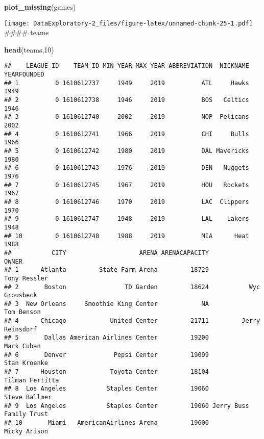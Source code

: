 \documentclass[
]{article}
\newenvironment{Shaded}{\begin{snugshade}}{\end{snugshade}}
\newcommand{\DecValTok}[1]{\textcolor[rgb]{0.00,0.00,0.81}{#1}}
\newcommand{\KeywordTok}[1]{\textcolor[rgb]{0.13,0.29,0.53}{\textbf{#1}}}
\newcommand{\NormalTok}[1]{#1}
\begin{document}
\begin{Shaded}
\begin{Highlighting}[]
\KeywordTok{plot\_missing}\NormalTok{(games)}
\end{Highlighting}
\end{Shaded}

\texttt{[image: DataExploratory-2\_files/figure-latex/unnamed-chunk-25-1.pdf]}
\#\#\#\# teams

\begin{Shaded}
\begin{Highlighting}[]
\KeywordTok{head}\NormalTok{(teams,}\DecValTok{10}\NormalTok{)}
\end{Highlighting}
\end{Shaded}

\begin{verbatim}
##    LEAGUE_ID    TEAM_ID MIN_YEAR MAX_YEAR ABBREVIATION  NICKNAME YEARFOUNDED
## 1          0 1610612737     1949     2019          ATL     Hawks        1949
## 2          0 1610612738     1946     2019          BOS   Celtics        1946
## 3          0 1610612740     2002     2019          NOP  Pelicans        2002
## 4          0 1610612741     1966     2019          CHI     Bulls        1966
## 5          0 1610612742     1980     2019          DAL Mavericks        1980
## 6          0 1610612743     1976     2019          DEN   Nuggets        1976
## 7          0 1610612745     1967     2019          HOU   Rockets        1967
## 8          0 1610612746     1970     2019          LAC  Clippers        1970
## 9          0 1610612747     1948     2019          LAL    Lakers        1948
## 10         0 1610612748     1988     2019          MIA      Heat        1988
##           CITY                    ARENA ARENACAPACITY                   OWNER
## 1      Atlanta         State Farm Arena         18729            Tony Ressler
## 2       Boston                TD Garden         18624           Wyc Grousbeck
## 3  New Orleans     Smoothie King Center            NA              Tom Benson
## 4      Chicago            United Center         21711         Jerry Reinsdorf
## 5       Dallas American Airlines Center         19200              Mark Cuban
## 6       Denver             Pepsi Center         19099            Stan Kroenke
## 7      Houston            Toyota Center         18104         Tilman Fertitta
## 8  Los Angeles           Staples Center         19060           Steve Ballmer
## 9  Los Angeles           Staples Center         19060 Jerry Buss Family Trust
## 10       Miami   AmericanAirlines Arena         19600            Micky Arison

\end{verbatim}
\end{document}
